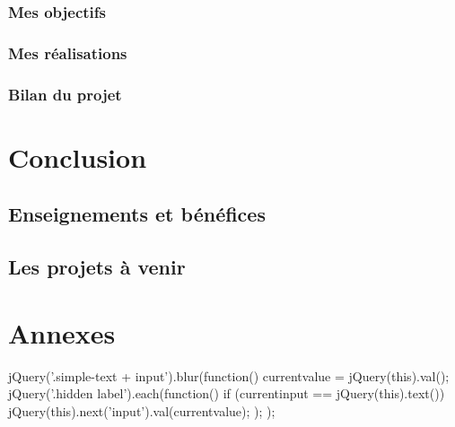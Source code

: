 \documentclass[a4paper,11pt,twoside]{report}
\begin{document}
    \subsection*{Mes objectifs}
    \subsection*{Mes réalisations}
    \subsection*{Bilan du projet}
    

\chapter*{Conclusion}
  \section*{Enseignements et bénéfices}
  \section*{Les projets à venir}

\chapter*{Annexes}

\listoffigures

\begin{verbatimtab}[4] 
jQuery('.simple-text + input').blur(function(){
            currentvalue = jQuery(this).val();
            jQuery('.hidden label').each(function() {
                if (currentinput == jQuery(this).text()) {
                    jQuery(this).next('input').val(currentvalue);
                }
            });
        });
\end{verbatimtab}
\end{document}
